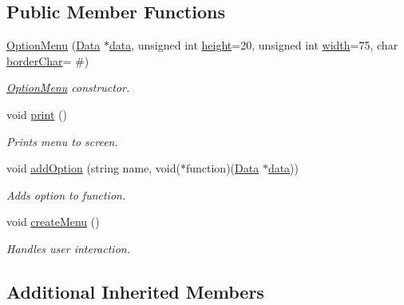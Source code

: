 \subsection*{Public Member Functions}
\begin{DoxyCompactItemize}
\item 
\hyperlink{class_option_menu_a76889e484d801886f5d48180e4f64a31}{Option\+Menu} (\hyperlink{class_data}{Data} $\ast$\hyperlink{class_menu_a3914261df4f4fbadd9c0a854a5f42b0b}{data}, unsigned int \hyperlink{class_menu_a84dd6e7e6b263601781683951687bf42}{height}=20, unsigned int \hyperlink{class_menu_a934c7679ed1575cc9924919b9b3eccb1}{width}=75, char \hyperlink{class_menu_a912c40f15f93092412c8d6204c0f8788}{border\+Char}= \textquotesingle{}\#\textquotesingle{})
\begin{DoxyCompactList}\small\item\em \hyperlink{class_option_menu}{Option\+Menu} constructor. \end{DoxyCompactList}\item 
\hypertarget{class_option_menu_a753b91d8c99330c962d6ecbe520800d2}{}void \hyperlink{class_option_menu_a753b91d8c99330c962d6ecbe520800d2}{print} ()\label{class_option_menu_a753b91d8c99330c962d6ecbe520800d2}

\begin{DoxyCompactList}\small\item\em Prints menu to screen. \end{DoxyCompactList}\item 
void \hyperlink{class_option_menu_a82ce2285fb79bec7073b5358648f19b6}{add\+Option} (string name, void($\ast$function)(\hyperlink{class_data}{Data} $\ast$\hyperlink{class_menu_a3914261df4f4fbadd9c0a854a5f42b0b}{data}))
\begin{DoxyCompactList}\small\item\em Adds option to function. \end{DoxyCompactList}\item 
\hypertarget{class_option_menu_a30620df0e9871ce3bbdccf3cb094785f}{}void \hyperlink{class_option_menu_a30620df0e9871ce3bbdccf3cb094785f}{create\+Menu} ()\label{class_option_menu_a30620df0e9871ce3bbdccf3cb094785f}

\begin{DoxyCompactList}\small\item\em Handles user interaction. \end{DoxyCompactList}\end{DoxyCompactItemize}
\subsection*{Additional Inherited Members}


